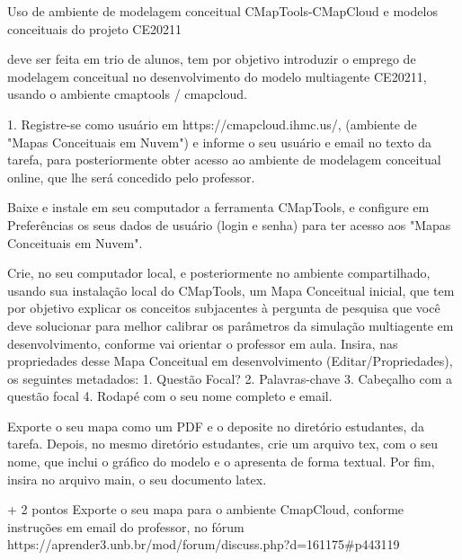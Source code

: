 Uso de ambiente de modelagem conceitual CMapTools-CMapCloud e modelos conceituais do projeto CE20211

deve ser feita em trio de alunos, tem por objetivo introduzir o emprego de modelagem conceitual no desenvolvimento do modelo multiagente CE20211, usando o ambiente cmaptools / cmapcloud.

1. Registre-se como usuário em https://cmapcloud.ihmc.us/, (ambiente de "Mapas Conceituais em Nuvem") e informe o seu usuário e email no texto da tarefa, para posteriormente obter acesso ao ambiente de modelagem conceitual online, que lhe será concedido pelo professor.

Baixe e instale em seu computador a ferramenta CMapTools, e configure em Preferências os seus dados de usuário (login e senha) para ter acesso aos "Mapas Conceituais em Nuvem".

Crie, no seu computador local, e posteriormente no ambiente compartilhado, usando sua instalação local do CMapTools, um Mapa Conceitual inicial, que tem por objetivo explicar os conceitos subjacentes à pergunta de pesquisa que você deve solucionar para melhor calibrar os parâmetros da simulação multiagente em desenvolvimento, conforme vai orientar o professor em aula. Insira, nas propriedades desse Mapa Conceitual em desenvolvimento (Editar/Propriedades), os seguintes metadados:
1. Questão Focal?
2. Palavras-chave
3. Cabeçalho com a questão focal
4. Rodapé com o seu nome completo e email.

Exporte o seu mapa como um PDF e o deposite no diretório estudantes, da tarefa. 
Depois, no mesmo diretório estudantes, crie um arquivo tex, com o seu nome, que inclui o gráfico do modelo e o apresenta de forma textual.
Por fim, insira no arquivo main, o seu documento latex.

+ 2 pontos
Exporte o seu mapa para o ambiente CmapCloud, conforme instruções em email do professor, no fórum https://aprender3.unb.br/mod/forum/discuss.php?d=161175#p443119

